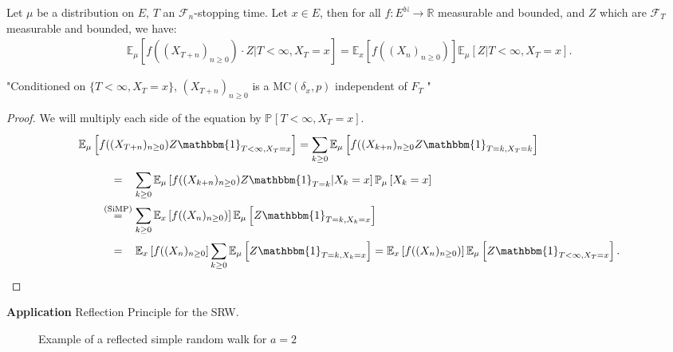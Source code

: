 \begin{theorem}
	Let $\mu $ be a distribution on $E$, $T$ an $ \mathcal{F}_n$-stopping time. Let $x \in E$,
	then for all $f:E^{\mathbb{N}} \to \mathbb{R}$ measurable and bounded, and $Z$ which are $ \mathcal{F}_T$ measurable and bounded, we have:
\begin{align}
	\boxed{ \mathbb{E}_{\mu } \left[ f((X_{T+n})_{n\geq 0}) \cdot Z | T<\infty, X_T=x \right] = \mathbb{E}_{x} \left[ f((X_n)_{n\geq 0}) \right]  \mathbb{E}_{\mu } \left[ Z | T<\infty, X_T=x \right]} 
.\end{align}
\end{theorem}
\noindent
"Conditioned on $\{T<\infty,X_T=x\}$, $(X_{T+n})_{n\geq 0}$ is a $ \textrm{MC}(\delta_x,p)$ independent of $F_T$ "
\begin{proof}
We will multiply each side of the equation by $\mathbb{P}_{} \left[ T < \infty, X_T =x \right]$.
\begin{align}
&	\mathbb{E}_{\mu } \left[ f((X_{T+n})_{n\geq 0})Z \mathbbm{1}_{T<\infty, X_T=x}  \right] =
		\sum_{k\geq 0}^{} \mathbb{E}_{\mu } \left[ f((X_{k+n})_{n\geq 0} Z \mathbbm{1}_{T=k, X_T=k}  \right] \\
&\qquad	\stackrel{\phantom{\text{(SiMP)}}}{=}  \sum_{k\geq 0}^{} \mathbb{E}_{\mu } \left[ f((X_{k+n})_{n\geq 0}) Z \mathbbm{1}_{T=k} | X_k = x \right] \mathbb{P}_{\mu } \left[ X_k = x  \right] \\ 
&\qquad	\stackrel{\text{(SiMP)}}{=} \sum_{k\geq 0}^{} \mathbb{E}_{x} \left[ f((X_{n})_{n\geq 0}) \right] \mathbb{E}_{\mu } \left[ Z \mathbbm{1}_{T=k, X_k = x}  \right] \\
&\qquad	\stackrel{\phantom{\text{(SiMP)}}}{=} \mathbb{E}_{x} \left[ f((X_n)_{n\geq 0} \right] \sum_{k\geq 0}^{} \mathbb{E}_{\mu } \left[ Z \mathbbm{1}_{T=k, X_k=x}  \right]  
		= \mathbb{E}_{x} \left[ f((X_n)_{n\geq 0}) \right] \mathbb{E}_{\mu } \left[ Z \mathbbm{1}_{T<\infty, X_T=x}  \right] 
.\end{align}
\end{proof}


\noindent
\textbf{Application} Reflection Principle for the SRW.
\begin{figure}[h!]
\begin{center}
\end{center}
\caption{Example of a reflected simple random walk for $a=2$}
\end{figure}

